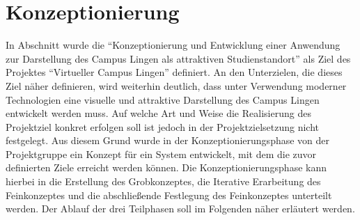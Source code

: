 \section{Konzeptionierung}
\label{sec:Konzeptionierung}

In Abschnitt  wurde die "`Konzeptionierung und Entwicklung
einer Anwendung zur Darstellung des Campus Lingen als attraktiven
Studienstandort"' als Ziel des Projektes "`Virtueller Campus Lingen"'
definiert. An den Unterzielen, die dieses Ziel näher definieren, wird weiterhin
deutlich, dass unter Verwendung moderner Technologien eine visuelle und
attraktive Darstellung des Campus Lingen entwickelt werden muss. Auf welche Art
und Weise die Realisierung des Projektziel konkret erfolgen soll ist jedoch in
der Projektzielsetzung nicht festgelegt. Aus diesem Grund wurde in der
Konzeptionierungsphase von der Projektgruppe ein Konzept für ein System
entwickelt, mit dem die zuvor definierten Ziele erreicht werden können. Die
Konzeptionierungsphase kann hierbei in die Erstellung des Grobkonzeptes, die
Iterative Erarbeitung des Feinkonzeptes und die abschließende Festlegung des
Feinkonzeptes unterteilt werden. Der Ablauf der drei Teilphasen soll im
Folgenden näher erläutert werden.




